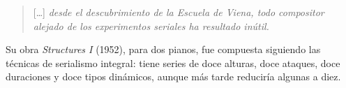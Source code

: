     \begin{quote}[\ldots] \emph{desde el descubrimiento de la Escuela de Viena, todo compositor alejado de los experimentos seriales ha resultado inútil.}\end{quote}

	Su obra \emph{Structures I} (1952), para dos pianos, fue compuesta siguiendo las técnicas de serialismo integral: tiene series de doce alturas, doce ataques, doce duraciones y
doce tipos dinámicos, aunque más tarde reduciría algunas a diez.